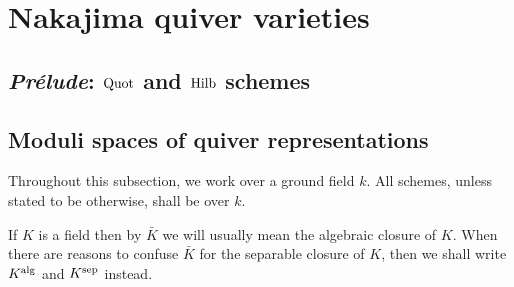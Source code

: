 \section{Nakajima quiver varieties}
    \subsection{\textit{Pr\'elude}: \texorpdfstring{$\mathrm{Quot}$}{} and \texorpdfstring{$\mathrm{Hilb}$}{} schemes}

    \subsection{Moduli spaces of quiver representations}
        \begin{convention}
            Throughout this subsection, we work over a ground field $k$. All schemes, unless stated to be otherwise, shall be over $k$.
        \end{convention}
        \begin{convention}
            If $K$ is a field then by $\bar{K}$ we will usually mean the algebraic closure of $K$. When there are reasons to confuse $\bar{K}$ for the separable closure of $K$, then we shall write $K^{\mathrm{alg}}$ and $K^{\mathrm{sep}}$ instead. 
        \end{convention}
        
